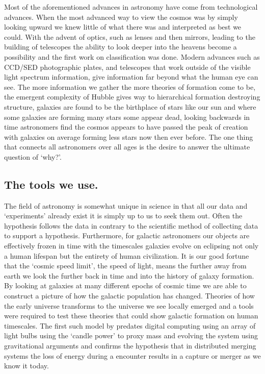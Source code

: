 Most of the aforementioned advances in astronomy have come from technological advances. When the most advanced way to view the cosmos was by simply looking upward we knew little of what there was and interpreted as best we could. With the advent of optics, such as lenses and then mirrors, leading to the building of telescopes the ability to look deeper into the heavens become a possibility and the first work on classification was done. Modern advances such as CCD/SED photographic plates, and telescopes that work outside of the visible light spectrum information, give information far beyond what the human eye can see. The more information we gather the more theories of formation come to be, the emergent complexity of Hubble gives way to hierarchical formation destroying structure, galaxies are found to be the birthplace of stars like our sun and where some galaxies are forming many stars some appear dead, looking backwards in time astronomers find the cosmos appears to have passed the peak of creation with galaxies on average forming less stars now then ever before. The one thing that connects all astronomers over all ages is the desire to answer the ultimate question of `why?'.

\subsection{The tools we use.}
The field of astronomy is somewhat unique in science in that all our data and `experiments' already exist it is simply up to us to seek them out. Often the hypothesis follows the data in contrary to the scientific method of collecting data to support a hypothesis. Furthermore, for galactic astronomers our objects are effectively frozen in time with the timescales galaxies evolve on eclipsing not only a human lifespan but the entirety of human civilization. It is our good fortune that the `cosmic speed limit', the speed of light, means the further away from earth we look the further back in time and into the history of galaxy formation. By looking at galaxies at many different epochs of cosmic time we are able to construct a picture of how the galactic population has changed. Theories of how the early universe transforms to the universe we see locally emerged and a tools were required to test these theories that could show galactic formation on human timescales. The first such model by \citet{Holmberg1941OnProcedure.} predates digital computing using an array of light bulbs using the `candle power' to proxy mass and evolving the system using gravitational arguments and confirms the hypothesis that in distributed merging systems the loss of energy during a encounter results in a capture or merger as we know it today.


